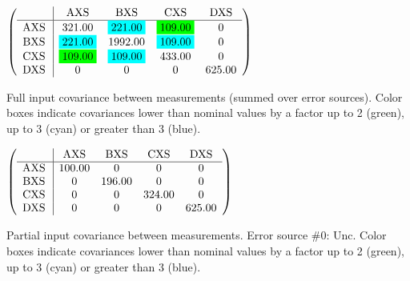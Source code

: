 \begin{table}[H]
\scriptsize
\begin{center}
\renewcommand{\arraystretch}{1.1}
\begin{math}\left(\begin{array}{c|cccc}
 & \mathrm{AXS} & 
\mathrm{BXS} & 
\mathrm{CXS} & 
\mathrm{DXS} \\
\hline
\mathrm{AXS} \hspace*{2pt} &     321.00 &  \colorbox{Cyan1}{$    221.00$} &  \colorbox{Green1}{$    109.00$} &  0 \\
\mathrm{BXS} \hspace*{2pt} &  \colorbox{Cyan1}{$    221.00$} &    1992.00 &  \colorbox{Cyan1}{$    109.00$} &  0 \\
\mathrm{CXS} \hspace*{2pt} &  \colorbox{Green1}{$    109.00$} &  \colorbox{Cyan1}{$    109.00$} &     433.00 &  0 \\
\mathrm{DXS} \hspace*{2pt} &  0 &  0 &  0 &     625.00 \\
\end{array}\right)\end{math}
\caption{Full input covariance between measurements (summed over error sources). Color boxes indicate covariances lower than nominal values by a factor up to 2 (green), up to 3 (cyan) or greater than 3 (blue).}
\renewcommand{\arraystretch}{1}
\end{center}
\end{table}
\begin{table}[H]
\scriptsize
\begin{center}
\renewcommand{\arraystretch}{1.1}
\begin{math}\left(\begin{array}{c|cccc}
 & \mathrm{AXS} & 
\mathrm{BXS} & 
\mathrm{CXS} & 
\mathrm{DXS} \\
\hline
\mathrm{AXS} \hspace*{2pt} &     100.00 &  0 &  0 &  0 \\
\mathrm{BXS} \hspace*{2pt} &  0 &     196.00 &  0 &  0 \\
\mathrm{CXS} \hspace*{2pt} &  0 &  0 &     324.00 &  0 \\
\mathrm{DXS} \hspace*{2pt} &  0 &  0 &  0 &     625.00 \\
\end{array}\right)\end{math}
\caption{Partial input covariance between measurements. Error source \#0: Unc. Color boxes indicate covariances lower than nominal values by a factor up to 2 (green), up to 3 (cyan) or greater than 3 (blue).}
\renewcommand{\arraystretch}{1}
\end{center}
\end{table}
